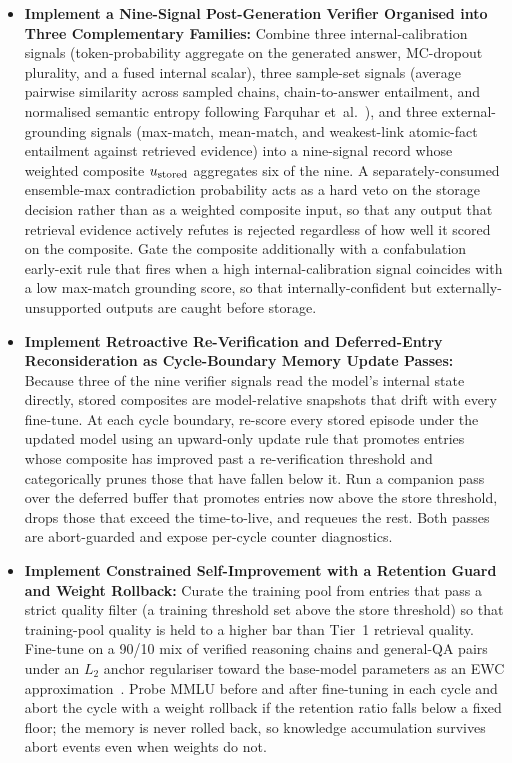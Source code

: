 \begin{itemize}
    \item \textbf{Implement a Nine-Signal Post-Generation Verifier Organised into Three Complementary Families:} Combine three internal-calibration signals (token-probability aggregate on the generated answer, MC-dropout plurality, and a fused internal scalar), three sample-set signals (average pairwise similarity across sampled chains, chain-to-answer entailment, and normalised semantic entropy following Farquhar et~al.~\cite{farquhar2024semantic}), and three external-grounding signals (max-match, mean-match, and weakest-link atomic-fact entailment against retrieved evidence) into a nine-signal record whose weighted composite $u_{\text{stored}}$ aggregates six of the nine. A separately-consumed ensemble-max contradiction probability acts as a hard veto on the storage decision rather than as a weighted composite input, so that any output that retrieval evidence actively refutes is rejected regardless of how well it scored on the composite. Gate the composite additionally with a confabulation early-exit rule that fires when a high internal-calibration signal coincides with a low max-match grounding score, so that internally-confident but externally-unsupported outputs are caught before storage.

    \item \textbf{Implement Retroactive Re-Verification and Deferred-Entry Reconsideration as Cycle-Boundary Memory Update Passes:} Because three of the nine verifier signals read the model's internal state directly, stored composites are model-relative snapshots that drift with every fine-tune. At each cycle boundary, re-score every stored episode under the updated model using an upward-only update rule that promotes entries whose composite has improved past a re-verification threshold and categorically prunes those that have fallen below it. Run a companion pass over the deferred buffer that promotes entries now above the store threshold, drops those that exceed the time-to-live, and requeues the rest. Both passes are abort-guarded and expose per-cycle counter diagnostics.

    \item \textbf{Implement Constrained Self-Improvement with a Retention Guard and Weight Rollback:} Curate the training pool from entries that pass a strict quality filter (a training threshold set above the store threshold) so that training-pool quality is held to a higher bar than Tier~1 retrieval quality. Fine-tune on a 90/10 mix of verified reasoning chains and general-QA pairs under an $L_2$ anchor regulariser toward the base-model parameters as an EWC approximation~\cite{doi:10.1073/pnas.1611835114}. Probe MMLU before and after fine-tuning in each cycle and abort the cycle with a weight rollback if the retention ratio falls below a fixed floor; the memory is never rolled back, so knowledge accumulation survives abort events even when weights do not.


\end{itemize}
